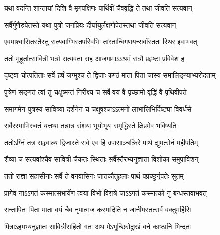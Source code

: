 \begin{center}



\twolineshloka
{यथा वदन्ति शान्तायां दिशि वै मृगपक्षिणः}
{पार्थिवीं चैववृद्धिं ते तथा जीवति सत्यवान्}




\twolineshloka
{सर्वैर्गुणैरुपेतस्ते यथा पुत्रो जनप्रियः}
{दीर्घायुर्लक्षणोपेतस्तथा जीवति सत्यवान्}




\twolineshloka
{एवमाश्वासितस्तैस्तु सत्यवाग्भिस्तपस्विभिः}
{तांस्तान्विगणयन्सर्वांस्ततः स्थिर इवाभवत्}


\twolineshloka
{ततो मुहूर्तात्सावित्री भर्त्रा सत्यवता सह}
{आजगामाऽऽश्रमं रात्रौ प्रहृष्टा प्रविवेश ह}


\twolineshloka
{दृष्ट्वा चोत्पतिताः सर्वे हर्षं जग्मुश्च ते द्विजाः}
{कण्ठं माता पिता चास्य  समालिङ्ग्याभ्यरोदताम्}




\twolineshloka
{पुत्रेण सङ्गतं त्वां तु चक्षुष्मन्तं निरीक्ष्य च}
{सर्वे वयं वै पृच्छामो वृद्धिं वै पृथिवीपते}


\twolineshloka
{समागमेन पुत्रस्य सावित्र्या दर्शनेन च}
{चक्षुषश्चाऽऽत्मनो लाभात्त्रिभिर्दिष्ट्या विवर्धसे}


\twolineshloka
{सर्वैरस्माभिरुक्तं यत्तथा तन्नात्र संशयः}
{भूयोभूयः समृद्धिस्ते क्षिप्रमेव भविष्यति}




\twolineshloka
{ततोऽग्निं तत्र सञ्ज्वाल्य द्विजास्ते सर्व एव हि}
{उपासाञ्चक्रिरे पार्थ द्युमत्सेनं महीपतिम्}


\twolineshloka
{शैव्या च सत्यवांश्चैव सावित्री चैकतः स्थिताः}
{सर्वैस्तैरभ्यनुज्ञाता विशोका समुपाविशन्}


\twolineshloka
{ततो राज्ञा सहासीनाः सर्वे ते वनवासिनः}
{जातकौतूहलाः पार्थ पप्रच्छुर्नृपतेः सुतम्}


\twolineshloka
{प्रागेव नाऽऽगतं कस्मात्सभार्येण त्वया विभो}
{विरात्रे चाऽऽगतं कस्मात्को नु बन्धस्तवाभवत्}


\twolineshloka
{सन्तापितः पिता माता वयं चैव नृपात्मज}
{कस्मादिति न जानीमस्तत्सर्वं वक्तुमर्हिसि}




\twolineshloka
{पित्राऽहमभ्यनुज्ञातः सावित्रीसहितो गतः}
{अथ मेऽभूच्छिरोदुःखं वने काष्ठानि भिन्दतः}



\end{center}
